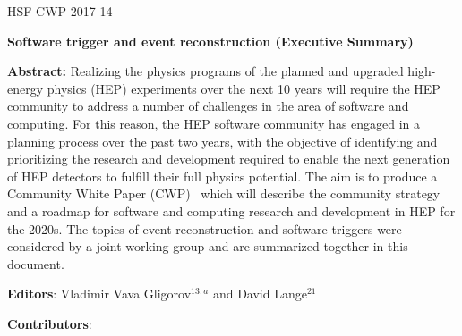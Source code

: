 \begin{flushright}
HSF-CWP-2017-14
\end{flushright}

\Large
\begin{center}
{\bf Software trigger and event reconstruction (Executive Summary)}
\end{center}
\vskip 1cm

\normalsize


\hangindent=1cm
{\bf Abstract:} Realizing the physics programs of the planned and upgraded high-energy physics (HEP) experiments over the next 10 years will require the HEP community to address a number of challenges in the area of software and computing. For this reason, the HEP software community has engaged in a planning process over the past two years, with the objective of identifying and prioritizing the research and development required to enable the next generation of HEP detectors to fulfill their full physics potential. The aim is to produce a Community White Paper (CWP)~\cite{HSF2017} which will describe the community strategy and a roadmap for software and computing research and development in HEP for the 2020s. The topics of event reconstruction and software triggers were considered by a joint working group and are summarized together in this document.

\vskip 1cm


\hangindent=1cm
{\bf Editors}: Vladimir Vava Gligorov$^{13,a}$ and David Lange$^{21}$

\vskip 0.2cm
\hangindent=1cm
{\bf Contributors}:

